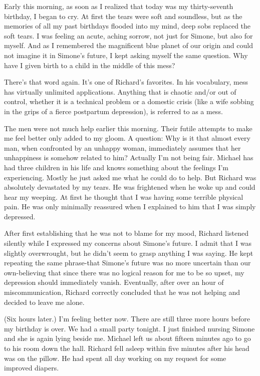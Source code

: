 \documentclass[]{article}
\begin{document}
Early this morning, as soon as I realized that today was my thirty-seventh birthday, I began to cry. At first the tears were soft and soundless, but as the memories of all my past birthdays flooded into my mind, deep sobs replaced the soft tears. I was feeling an acute, aching sorrow, not just for Simone, but also for myself. And as I remembered the magnificent blue planet of our origin and could not imagine it in Simone’s future, I kept asking myself the same question. Why have I given birth to a child in the middle of this mess?

There’s that word again. It’s one of Richard’s favorites. In his vocabulary, mess has virtually unlimited applications. Anything that is chaotic and/or out of control, whether it is a technical problem or a domestic crisis (like a wife sobbing in the grips of a fierce postpartum depression), is referred to as a mess.

The men were not much help earlier this morning. Their futile attempts to make me feel better only added to my gloom. A question: Why is it that almost every man, when confronted by an unhappy woman, immediately assumes that her unhappiness is somehow related to him? Actually I’m not being fair. Michael has had three children in his life and knows something about the feelings I’m experiencing. Mostly he just asked me what he could do to help. But Richard was absolutely devastated by my tears. He was frightened when he woke up and could hear my weeping. At first he thought that I was having some terrible physical pain. He was only minimally reassured when I explained to him that I was simply depressed.

After first establishing that he was not to blame for my mood, Richard listened silently while I expressed my concerns about Simone’s future. I admit that I was slightly overwrought, but he didn’t seem to grasp anything I was saying. He kept repeating the same phrase-that Simone’s future was no more uncertain than our own-believing that since there was no logical reason for me to be so upset, my depression should immediately vanish. Eventually, after over an hour of miscommunication, Richard correctly concluded that he was not helping and decided to leave me alone.

(Six hours later.) I’m feeling better now. There are still three more hours before my birthday is over. We had a small party tonight. I just finished nursing Simone and she is again lying beside me. Michael left us about fifteen minutes ago to go to his room down the hall. Richard fell asleep within five minutes after his head was on the pillow. He had spent all day working on my request for some improved diapers.
\end{document}
